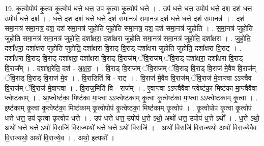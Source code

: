 \documentclass[17pt]{extarticle}
\begin{document}
19. कृ॒त्वोपोप॑ कृ॒त्वा कृ॒त्वोप॑ धत्ते धत्त॒ उप॑ कृ॒त्वा कृ॒त्वोप॑ धत्ते । . उप॑ धत्ते धत्त॒ उपोप॑ धत्ते॒ दश॒ दश॑ धत्त॒ उपोप॑ धत्ते॒ दश॑ । . ध॒त्ते॒ दश॒ दश॑ धत्ते धत्ते॒ दश॑ समा॒नत्र॑ समा॒नत्र॒ दश॑ धत्ते धत्ते॒ दश॑ समा॒नत्र॑ । . दश॑ समा॒नत्र॑ समा॒नत्र॒ दश॒ दश॑ समा॒नत्र॑ जुहोति जुहोति समा॒नत्र॒ दश॒ दश॑ समा॒नत्र॑ जुहोति । . स॒मा॒नत्र॑ जुहोति जुहोति समा॒नत्र॑ समा॒नत्र॑ जुहोति॒ दशा᳚क्षरा॒ दशा᳚क्षरा जुहोति समा॒नत्र॑ समा॒नत्र॑ जुहोति॒ दशा᳚क्षरा । . जु॒हो॒ति॒ दशा᳚क्षरा॒ दशा᳚क्षरा जुहोति जुहोति॒ दशा᳚क्षरा वि॒राड् वि॒राड् दशा᳚क्षरा जुहोति जुहोति॒ दशा᳚क्षरा वि॒राट् । . दशा᳚क्षरा वि॒राड् वि॒राड् दशा᳚क्षरा॒ दशा᳚क्षरा वि॒राड् वि॒राज॑म् ॅवि॒राज॑म् ॅवि॒राड् दशा᳚क्षरा॒ 
दशा᳚क्षरा वि॒राड् वि॒राज᳚म् । . दशा᳚क्ष॒रेति॒ दश॑ - अ॒क्ष॒रा॒ । . वि॒राड् वि॒राज॑म् ॅवि॒राज॑म् ॅवि॒राड् वि॒राड् वि॒राज॑ मे॒वैव वि॒राज॑म् ॅवि॒राड् वि॒राड् वि॒राज॑ मे॒व । . वि॒राडिति॑ वि - राट् । . वि॒राज॑ मे॒वैव वि॒राज॑म् ॅवि॒राज॑ मे॒वाप्त्वा ऽऽप्त्वैव वि॒राज॑म् ॅवि॒राज॑ मे॒वाप्त्वा । . वि॒राज॒मिति॑ वि - राज᳚म् । . ए॒वाप्त्वा ऽऽप्त्वैवैवा प्त्वेष्ट॑का॒ मिष्ट॑का मा॒प्त्वैवैवा प्त्वेष्ट॑काम् । . आ॒प्त्वेष्ट॑का॒ मिष्ट॑का मा॒प्त्वा ऽऽप्त्वेष्ट॑काम् कृ॒त्वा कृ॒त्वेष्ट॑का मा॒प्त्वा ऽऽप्त्वेष्ट॑काम् कृ॒त्वा । . इष्ट॑काम् कृ॒त्वा कृ॒त्वेष्ट॑का॒ मिष्ट॑काम् कृ॒त्वोपोप॑ कृ॒त्वेष्ट॑का॒ मिष्ट॑काम् कृ॒त्वोप॑ । . कृ॒त्वोपोप॑ कृ॒त्वा कृ॒त्वोप॑ धत्ते धत्त॒ उप॑ कृ॒त्वा कृ॒त्वोप॑ धत्ते । . उप॑ धत्ते धत्त॒ उपोप॑ ध॒त्ते ऽथो॒ अथो॑ धत्त॒ उपोप॑ ध॒त्ते ऽथो᳚ । . ध॒त्ते ऽथो॒ अथो॑ धत्ते ध॒त्ते ऽथो॑ वि॒राजि॑ वि॒राज्यथो॑ धत्ते ध॒त्ते ऽथो॑ वि॒राजि॑ । . अथो॑ वि॒राजि॑ वि॒राज्यथो॒ अथो॑ वि॒राज्ये॒वैव वि॒राज्यथो॒ अथो॑ वि॒राज्ये॒व । . अथो॒ इत्यथो᳚ । \newline
\end{document}
